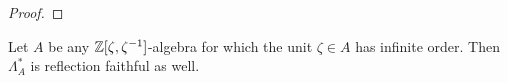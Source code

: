 \begin{proof}
\end{proof}

\begin{lemma}\label{lemma reff for V*} Let $A$ be any $\mathbb{Z}[\zeta, \zeta^{-1}]$-algebra for which the unit $\zeta \in A$ has infinite order. Then $\Lambda_A^*$ is reflection faithful as well. \end{lemma}

